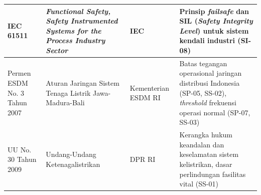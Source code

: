 \begin{longtable}{|p{3cm}|p{4.5cm}|p{2cm}|p{4.5cm}|}
IEC 61511 & \textit{Functional Safety, Safety Instrumented Systems for the Process Industry Sector} \cite{IEC61511_2016} & IEC & Prinsip \textit{failsafe} dan SIL (\textit{Safety Integrity Level}) untuk sistem kendali industri (SI-08) \\ \hline
Permen ESDM No. 3 Tahun 2007 & Aturan Jaringan Sistem Tenaga Listrik Jawa-Madura-Bali \cite{PermenESDM2007} & Kementerian ESDM RI & Batas tegangan operasional jaringan distribusi Indonesia (SP-05, SS-02), \textit{threshold} frekuensi operasi normal (SP-07, SS-03) \\ \hline
UU No. 30 Tahun 2009 & Undang-Undang Ketenagalistrikan \cite{UU30_2009} & DPR RI & Kerangka hukum keandalan dan keselamatan sistem kelistrikan, dasar perlindungan fasilitas vital (SS-01) \\
\end{longtable}